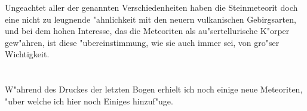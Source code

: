 \documentclass[a4paper, 11pt, oneside]{article}
\begin{document}
Ungeachtet aller der genannten Verschiedenheiten haben die Steinmeteorit doch eine nicht zu leugnende "ahnlichkeit mit den neuern vulkanischen Gebirgsarten, und bei dem hohen Interesse, das die Meteoriten als au"sertellurische K"orper gew"ahren, ist diese "ubereinstimmung, wie sie auch immer sei, von gro"ser Wichtigkeit.
\clearpage
\section{}
\paragraph{}
W"ahrend des Druckes der letzten Bogen erhielt ich noch einige neue Meteoriten, "uber welche ich hier noch Einiges hinzuf"uge.
\end{document}
